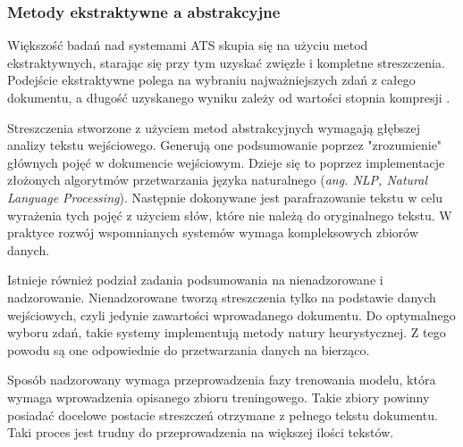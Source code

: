 \documentclass[12pt,a4paper,twoside]{article}
\begin{document}
\subsubsection{Metody ekstraktywne a abstrakcyjne}
Większość badań nad systemami ATS skupia się na użyciu metod ekstraktywnych, starając się przy tym uzyskać zwięzłe i kompletne streszczenia. Podejście ekstraktywne polega na wybraniu najważniejszych zdań z całego dokumentu, a długość uzyskanego wyniku zależy od wartości stopnia kompresji \cite{Gambhir2017}. \par
Streszczenia stworzone z użyciem metod abstrakcyjnych wymagają głębszej analizy tekstu wejściowego. Generują one podsumowanie poprzez "zrozumienie" głównych pojęć w dokumencie wejściowym. Dzieje się to poprzez implementacje złożonych algorytmów przetwarzania języka naturalnego (\textit{ang. NLP, Natural Language Processing}). Następnie dokonywane jest parafrazowanie tekstu w celu wyrażenia tych pojęć z użyciem słów, które nie należą do oryginalnego tekstu. W praktyce rozwój wspomnianych systemów wymaga kompleksowych zbiorów danych.\par
Istnieje również podział zadania podsumowania na nienadzorowane i nadzorowanie. Nienadzorowane tworzą streszczenia tylko na podstawie danych wejściowych, czyli jedynie zawartości wprowadanego dokumentu. Do optymalnego wyboru zdań, takie systemy implementują metody natury heurystycznej. Z tego powodu są one odpowiednie do przetwarzania danych na bierząco.\par
Sposób nadzorowany wymaga przeprowadzenia fazy trenowania modelu, która wymaga wprowadzenia opisanego zbioru treningowego. Takie zbiory powinny posiadać docelowe postacie streszczeń otrzymane z pełnego tekstu dokumentu. Taki proces jest trudny do przeprowadzenia na większej ilości tekstów.
\end{document}
